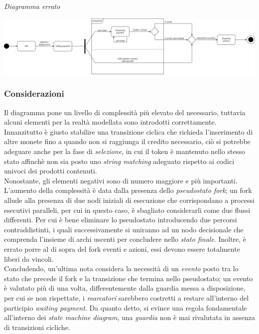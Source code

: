 \documentclass{article}
\begin{document}
\textit{Diagramma errato}
\begin{center}
\includegraphics[width=1\textwidth]{foto 6.png}    
\end{center}

\subsubsection*{Considerazioni}
Il diagramma pone un livello di complessità più elevato del necessario, tuttavia alcuni elementi per la realtà modellata sono introdotti correttamente. Innanzitutto è giusto stabilire una transizione ciclica che richieda l'inserimento di altre monete fino a quando non si raggiunga il credito necessario, ciò si potrebbe adeguare anche per la fase di \textit{selezione}, in cui il token è mantenuto nello stesso stato affinchè non sia posto uno \textit{string matching} adeguato rispetto ai codici univoci dei prodotti contenuti.\vspace*{14pt}\\
Nonostante, gli elementi negativi sono di numero maggiore e più importanti. L'aumento della complessità è data dalla presenza dello \textit{pseudostato fork}; un fork allude alla presenza di due nodi iniziali di esecuzione che corrispondano a processi esecutivi paralleli, per cui in questo caso, è sbagliato considerarli come due flussi differenti. Per cui è bene eliminare lo pseudostato introducendo due percorsi contraddistinti, i quali successivamente si uniranno ad un nodo decisionale che comprenda l'insieme di archi uscenti per concludere nello \textit{stato finale}. Inoltre, è errato porre al di sopra del fork eventi e azioni, essi devono essere totalmente liberi da vincoli.\vspace*{14pt}\\
Concludendo, un'ultima nota considera la necessità di un \textit{evento} posto tra lo stato che precede il fork e la transizione che termina nello pseudostato; un evento è valutato più di una volta, differentemente dalla guardia messa a disposizione, per cui se non rispettate, i \textit{marcatori} sarebbero costretti a restare all'interno del participio \textit{waiting payment}. Da quanto detto, si evince una regola fondamentale all'interno dei \textit{state machine diagram}, una \textit{guardia} non è mai rivalutata in assenza di transizioni cicliche.\vspace*{14pt}\\
\end{document}
